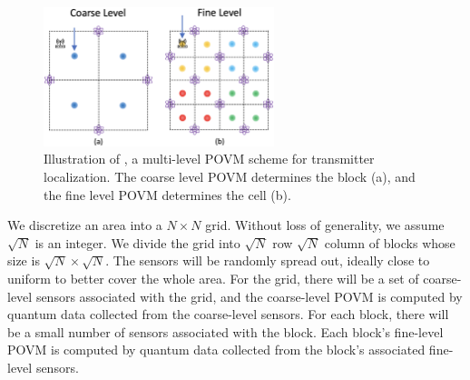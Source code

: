 \begin{figure}
    \centering
    \includegraphics[width=0.6\textwidth]{chapters/qce/figures/povm-loc.png}
    \caption{Illustration of \povm, a multi-level POVM scheme for transmitter localization. The coarse level POVM determines the block (a), and the fine level POVM determines the cell (b).}
    \label{fig:povm-loc}
\end{figure}

We discretize an area into a $N\times N$ grid.
Without loss of generality, we assume $\sqrt{N}$ is an integer.
We divide the grid into $\sqrt{N}$ row $\sqrt{N}$ column of blocks whose size is $\sqrt{N}\times\sqrt{N}$.
The sensors will be randomly spread out, ideally close to uniform to better cover the whole area.
For the grid, there will be a set of coarse-level sensors associated with the grid, and the coarse-level POVM is computed by quantum data collected from the coarse-level sensors.
For each block, there will be a small number of sensors associated with the block. 
Each block's fine-level POVM is computed by quantum data collected from the block's associated fine-level sensors.


